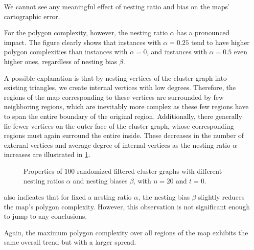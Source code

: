 We cannot see any meaningful effect of nesting ratio and bias on the maps' cartographic error.

For the polygon complexity, however, the nesting ratio $\alpha$ has a pronounced impact.
The figure clearly shows that instances with $\alpha = 0.25$ tend to have higher polygon complexities than instances with $\alpha = 0$, and instances with $\alpha = 0.5$ even higher ones, regardless of nesting bias $\beta$.

A possible explanation is that by nesting vertices of the cluster graph into existing triangles, we create internal vertices with low degrees.
Therefore, the regions of the map corresponding to these vertices are surrounded by few neighboring regions, which are inevitably more complex as these few regions have to span the entire boundary of the original region.
Additionally, there generally lie fewer vertices on the outer face of the cluster graph, whose corresponding regions must again surround the entire inside.
These decreases in the number of external vertices and average degree of internal vertices as the nesting ratio $\alpha$ increases are illustrated in \cref{fig:experimental-evaluation-variable-nesting-ratio-and-bias-2}.

\begin{figure}[H]
	\centering
	\quad
	\caption{Properties of 100 randomized filtered cluster graphs  with different nesting ratios $\alpha$ and nesting biases $\beta$, with $n = 20$ and $t = 0$.}
	\label{fig:experimental-evaluation-variable-nesting-ratio-and-bias-2}
\end{figure}

 also indicates that for fixed a nesting ratio $\alpha$, the nesting bias $\beta$ slightly reduces the map's polygon complexity.
However, this observation is not significant enough to jump to any conclusions.

Again, the maximum polygon complexity over all regions of the map exhibits the same overall trend but with a larger spread.
